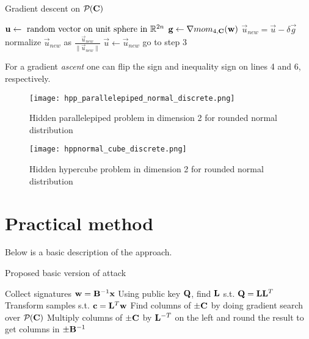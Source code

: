 \begin{algorithm}[H]
    \caption{Gradient descent on $\mathcal{P}_{}(\mathbf{C})$}
\begin{algorithmic}[1]
    \State $\mathbf{u} \gets \text{ random vector on unit sphere in } \mathbb{R}^{2n}$
    \Loop
    \State $\mathbf{g} \gets \nabla mom_{4, \mathbf{C}}(\mathbf{w})$
    \State $\vec{u}_{new} = \vec{u} - \delta \vec{g}$
    \State normalize $\vec{u}_{new}$ as $\frac{\vec{u}_{new}}{\lVert \vec{u}_{new} \rVert}$
    \State {}
    \Else 
    \State $\vec{u} \gets \vec{u}_{new}$
    \State go to step 3
    \EndIf
    \EndLoop
\end{algorithmic}
\end{algorithm}

For a gradient \textit{ascent} one can flip the sign and inequality sign on lines 4 and 6, respectively.

\begin{figure}[H]
    \centering
    \texttt{[image: hpp\_parallelepiped\_normal\_discrete.png]}
    \caption{Hidden parallelepiped problem in dimension 2 for rounded normal distribution}
  	\medskip 
    \label{parallelepiped_normal_discrete}
\end{figure}

\begin{figure}[H]
    \centering
    \texttt{[image: hppnormal\_cube\_discrete.png]}
    \caption{Hidden hypercube problem in dimension 2 for rounded normal distribution}
  	\medskip 
    \label{hypercube_normal_discrete}
\end{figure}
\section{Practical method}

Below is a basic description of the approach.
\begin{algorithm}[H]
\caption{Proposed basic version of attack}
\begin{algorithmic}[1]
    \State Collect signatures $\mathbf{w} = \mathbf{B}^{-1} \mathbf{x}$
    \State Using public key $\mathbf{Q}$, find $\mathbf{L}$ s.t. $\mathbf{Q} = \mathbf{L} \mathbf{L}^T$
    \State Transform samples s.t. $\mathbf{c} = \mathbf{L}^T \mathbf{w}$
    \State Find columns of $\pm \mathbf{C}$ by doing gradient search over $\mathcal{P}_{}(\mathbf{C})$
    \State Multiply columns of $\pm \mathbf{C}$ by $\mathbf{L}^{-T}$ on the left and round the result to get columns in $\pm \mathbf{B}^{-1}$
\end{algorithmic}
\end{algorithm}

